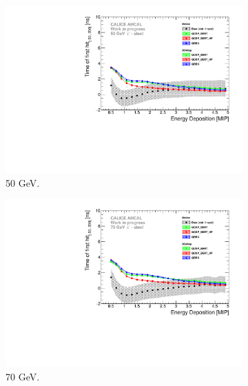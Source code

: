\begin{figure}[htbp!]
\begin{subfigure}[t]{0.5\textwidth}
		\includegraphics[width=1\textwidth]{../Thesis_Plots/Timing/Pions/Plots/ComparisonToSim/Time_Energy_50GeV.pdf}
		\caption{50 GeV.} \label{fig:Energy_SimData_50GeV}
	\end{subfigure}
	\hfill
	\begin{subfigure}[t]{0.5\textwidth}
		\centering
		\includegraphics[width=1\textwidth]{../Thesis_Plots/Timing/Pions/Plots/ComparisonToSim/Time_Energy_70GeV.pdf}
		\caption{70 GeV.} \label{fig:Energy_SimData_70GeV}
	\end{subfigure}
	\hfill
	\begin{subfigure}[t]{0.5\textwidth}
		\centering

\end{subfigure}
\end{figure}
